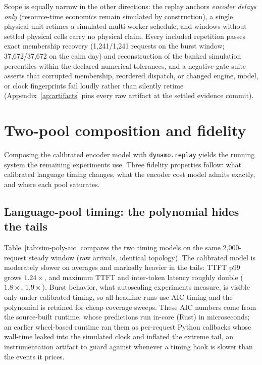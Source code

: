 Scope is equally narrow in the other directions: the replay anchors
\emph{encoder delays only} (resource-time economics remain simulated by
construction), a single physical unit retimes a simulated multi-worker
schedule, and windows without settled physical cells carry no physical
claim. Every included repetition passes exact membership recovery
(1{,}241/1{,}241 requests on the burst window; 37{,}672/37{,}672 on the
calm day) and reconstruction of the banked simulation percentiles within
the declared numerical tolerances, and a negative-gate suite asserts that corrupted
membership, reordered dispatch, or changed engine, model, or clock
fingerprints fail loudly rather than silently retime
(Appendix~\ref{ap:artifacts} pins every raw artifact at the settled
evidence commit).

\section{Two-pool composition and fidelity}
\label{sec:aic-twopool}

Composing the calibrated encoder model with \texttt{dynamo.replay} yields
the running system the remaining experiments use. Three fidelity properties
follow: what calibrated language timing changes, what the encoder cost model
admits exactly, and where each pool saturates.

\subsection{Language-pool timing: the polynomial hides the tails}
\label{sec:sim-timing}

Table~\ref{tab:sim-poly-aic} compares the two timing models on the same
2{,}000-request steady window (raw arrivals, identical topology). The
calibrated model is moderately slower on averages and markedly heavier in
the tails: TTFT p99 grows $1.24\times$, and maximum TTFT and inter-token
latency roughly double ($1.8\times$, $1.9\times$). Burst behavior, what
autoscaling experiments measure, is visible only under calibrated timing, so
all headline runs use AIC timing and the polynomial is retained for cheap
coverage sweeps. These AIC numbers come from the source-built runtime, whose
predictions run in-core (Rust) in microseconds; an earlier wheel-based
runtime ran them as per-request Python callbacks whose wall-time leaked into
the simulated clock and inflated the extreme tail, an instrumentation
artifact to guard against whenever a timing hook is slower than the events
it prices.

